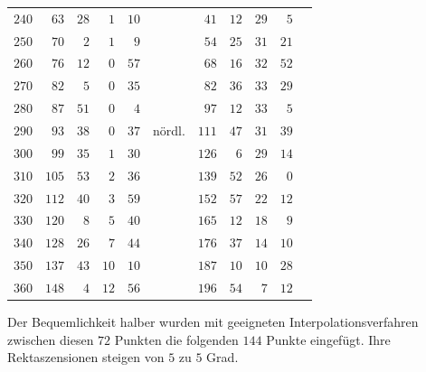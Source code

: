 \begin{center}
\begin{tabular}{r||rr|rrl||rr|rrl}
$240$&$63$&$28$&$1$&$10$&&$41$&$12$&$29$&$5$&\\[3pt]
$250$&$70$&$2$&$1$&$9$&&$54$&$25$&$31$&$21$&\\
$260$&$76$&$12$&$0$&$57$&&$68$&$16$&$32$&$52$&\\
$270$&$82$&$5$&$0$&$35$&&$82$&$36$&$33$&$29$&\\
$280$&$87$&$51$&$0$&$4$&&$97$&$12$&$33$&$5$&\\
$290$&$93$&$38$&$0$&$37$&nördl.&$111$&$47$&$31$&$39$&\\
$300$&$99$&$35$&$1$&$30$&&$126$&$6$&$29$&$14$&\\[3pt]
$310$&$105$&$53$&$2$&$36$&&$139$&$52$&$26$&$0$&\\
$320$&$112$&$40$&$3$&$59$&&$152$&$57$&$22$&$12$&\\
$330$&$120$&$8$&$5$&$40$&&$165$&$12$&$18$&$9$&\\
$340$&$128$&$26$&$7$&$44$&&$176$&$37$&$14$&$10$&\\
$350$&$137$&$43$&$10$&$10$&&$187$&$10$&$10$&$28$&\\
$360$&$148$&$4$&$12$&$56$&&$196$&$54$&$7$&$12$&
\end{tabular}
\endgroup
\end{center}
%
Der Bequemlichkeit halber wurden mit geeigneten Interpolationsverfahren
zwischen diesen $72$ Punkten die folgenden $144$ Punkte eingefügt. Ihre
Rektaszensionen steigen von $5$ zu $5$ Grad.

